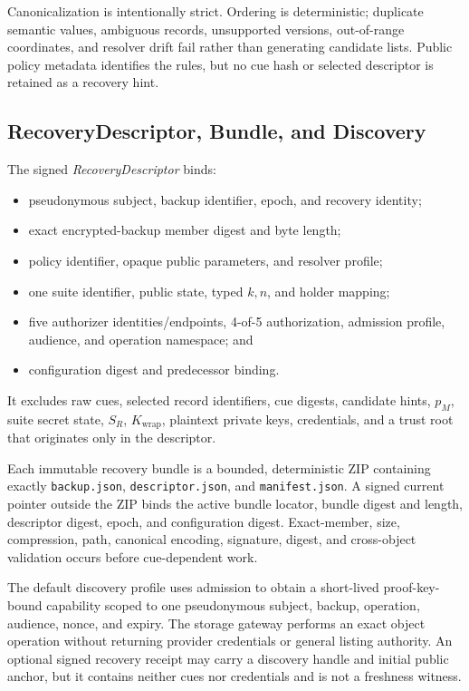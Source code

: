 \documentclass[sigconf,anonymous]{acmart}
\begin{document}
Canonicalization is intentionally strict. Ordering is deterministic; duplicate
semantic values, ambiguous records, unsupported versions, out-of-range
coordinates, and resolver drift fail rather than generating candidate lists.
Public policy metadata identifies the rules, but no cue hash or selected
descriptor is retained as a recovery hint.

\subsection{RecoveryDescriptor, Bundle, and Discovery}

The signed \emph{RecoveryDescriptor} binds:
\begin{itemize}
  \item pseudonymous subject, backup identifier, epoch, and recovery identity;
  \item exact encrypted-backup member digest and byte length;
  \item policy identifier, opaque public parameters, and resolver profile;
  \item one suite identifier, public state, typed \(k,n\), and holder mapping;
  \item five authorizer identities/endpoints, 4-of-5 authorization, admission
  profile, audience, and operation namespace; and
  \item configuration digest and predecessor binding.
\end{itemize}
It excludes raw cues, selected record identifiers, cue digests, candidate
hints, \(p_M\), suite secret state, \(S_R\), \(K_{\mathrm{wrap}}\), plaintext
private keys, credentials, and a trust root that originates only in the
descriptor.

Each immutable recovery bundle is a bounded, deterministic ZIP containing
exactly \texttt{backup.json}, \texttt{descriptor.json}, and
\texttt{manifest.json}. A signed current pointer outside the ZIP binds the
active bundle locator, bundle digest and length, descriptor digest, epoch, and
configuration digest. Exact-member, size, compression, path, canonical
encoding, signature, digest, and cross-object validation occurs before
cue-dependent work.

The default discovery profile uses admission to obtain a short-lived
proof-key-bound capability scoped to one pseudonymous subject, backup,
operation, audience, nonce, and expiry. The storage gateway performs an exact
object operation without returning provider credentials or general listing
authority. An optional signed recovery receipt may carry a discovery handle
and initial public anchor, but it contains neither cues nor credentials and is
not a freshness witness.
\end{document}
